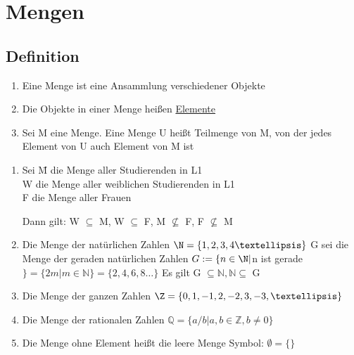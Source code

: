
\chapter{Mengen}
\section{Definition}
\begin{enumerate}
\item Eine Menge ist eine Ansammlung verschiedener Objekte
\item Die Objekte in einer Menge heißen \underline{Elemente}


\item Sei M eine Menge. Eine Menge U heißt Teilmenge von M, von der jedes Element von U auch Element von M ist

\end{enumerate}


\begin{enumerate}
\item \begin{tabbing}
Sei \=M die Menge aller Studierenden in L1\\
\> W  die Menge aller weiblichen Studierenden in L1\\
\> F die Menge aller Frauen \end{tabbing}
Dann gilt: W $\subseteq$ M, W $\subseteq$ F, M ${\not\subseteq}$ F, F ${\not\subseteq}$ M

\item Die Menge der natürlichen Zahlen
$\N = \{1,2,3,4 …\}$
G sei die Menge der geraden natürlichen Zahlen
$G := \{n \in \N | $n ist gerade$\} = \{2m | m \in \mathds{N}\} = \{2,4,6,8 …\}$
Es gilt G $\subseteq \mathds{N}, \mathds{N} \subseteq$ G

\item Die Menge der ganzen Zahlen
$\Z = \{0,1,-1,2,-2,3,-3, …\}$

\item Die Menge der rationalen Zahlen
$\mathds{Q} = \{a/b | a, b \in \mathds{Z}, b \neq 0\}$

\item Die Menge ohne Element heißt die leere Menge
Symbol: $\emptyset = \{\}$
\end{enumerate}


